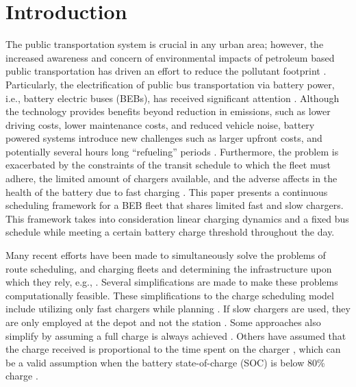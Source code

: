 \documentclass[utf8]{FrontiersinHarvard}
\let\cite\citep                                       %
\begin{document}
\section{Introduction}
\label{sec:introduction}
The public transportation system is crucial in any urban area; however, the increased awareness and concern of
environmental impacts of petroleum based public transportation has driven an effort to reduce the pollutant footprint
\cite{de-2014-simul-elect, xylia-2018-role-charg, guida-2017-zeeus-repor-europ, li-2016-batter-elect}. Particularly, the
electrification of public bus transportation via battery power, i.e., battery electric buses (BEBs), has received
significant attention \cite{li-2016-batter-elect}. Although the technology provides benefits beyond reduction in
emissions, such as lower driving costs, lower maintenance costs, and reduced vehicle noise, battery powered systems
introduce new challenges such as larger upfront costs, and potentially several hours long ``refueling'' periods
\cite{xylia-2018-role-charg, li-2016-batter-elect}. Furthermore, the problem is exacerbated by the constraints of the
transit schedule to which the fleet must adhere, the limited amount of chargers available, and the adverse affects in
the health of the battery due to fast charging \cite{lutsey-2019-updat-elect}. This paper presents a continuous
scheduling framework for a BEB fleet that shares limited fast and slow chargers. This framework takes into consideration
linear charging dynamics and a fixed bus schedule while meeting a certain battery charge threshold throughout the day.

Many recent efforts have been made to simultaneously solve the problems of route scheduling, and charging fleets and
determining the infrastructure upon which they rely, e.g., \cite{wei-2018-optim-spatio, sebastiani-2016-evaluat-elect,
  hoke-2014-accoun-lithium, wang-2017-elect-vehic}. Several simplifications are made to make these problems
computationally feasible. These simplifications to the charge scheduling model include utilizing only fast chargers
while planning \cite{wei-2018-optim-spatio, sebastiani-2016-evaluat-elect, wang-2017-optim-rechar, zhou-2020-bi-objec,
  yang-2018-charg-sched, wang-2017-elect-vehic, qin-2016-numer-analy,liu-2020-batter-elect}. If slow chargers are used,
they are only employed at the depot and not the station \cite{he-2020-optim-charg,tang-2019-robus-sched}. Some
approaches also simplify by assuming a full charge is always achieved
\cite{wei-2018-optim-spatio,wang-2017-elect-vehic,zhou-2020-bi-objec,wang-2017-optim-rechar}. Others have assumed that
the charge received is proportional to the time spent on the charger \cite{liu-2020-batter-elect,yang-2018-charg-sched},
which can be a valid assumption when the battery state-of-charge (SOC) is below 80\% charge
\cite{liu-2020-batter-elect}.
\end{document}
